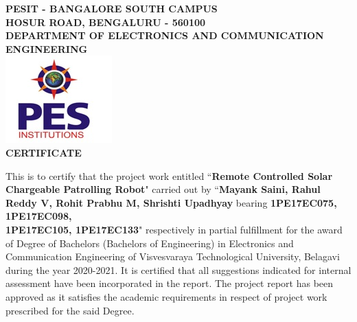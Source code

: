\begin{center}
\thispagestyle{empty}

\LARGE{\textbf{PESIT - BANGALORE SOUTH CAMPUS}} 
\large{\textbf{\\ HOSUR ROAD, BENGALURU - 560100}} \\ 
\large{\textbf{DEPARTMENT OF ELECTRONICS AND COMMUNICATION ENGINEERING}}\\[0.5cm]

\includegraphics[scale=1]{project/images/pesitbsc_logo}\\[0.5cm]

{\Large \textbf{CERTIFICATE}}\\[0.5cm]
\end{center}
\linespread{1.13}
\begin{flushleft}
\justify
\large{This is to certify that the project work entitled ``\textbf{Remote Controlled Solar \\Chargeable Patrolling Robot}" carried out by ``\textbf{Mayank Saini, Rahul Reddy V, Rohit Prabhu M, Shrishti Upadhyay} bearing \textbf{1PE17EC075, 1PE17EC098, \\1PE17EC105, 1PE17EC133}" respectively in partial fulfillment for the award of Degree of Bachelors (Bachelors of Engineering) in Electronics and Communication Engineering of Visvesvaraya Technological University, Belagavi during the year 2020-2021. It is certified that all suggestions indicated for internal assessment have been incorporated in the report. The project report has been approved as it satisfies the academic requirements in respect of project work prescribed for the said Degree.}
\end{flushleft}
